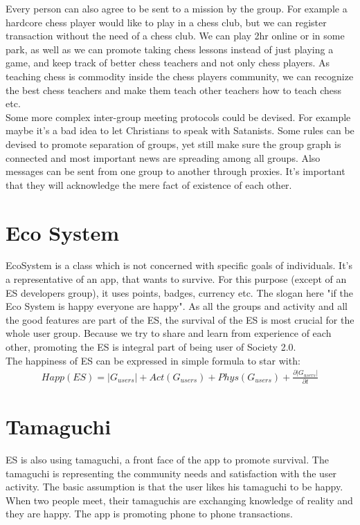 \documentclass{article}
\begin{document}
Every person can also agree to be sent to a mission by the group. For example a hardcore chess player would like to play in a chess club, but we can register transaction without the need of a chess club. We can play 2hr online or in some park, as well as we can promote taking chess lessons instead of just playing a game, and keep track of better chess teachers and not only chess players. As teaching chess is commodity inside the chess players community, we can recognize the best chess teachers and make them teach other teachers how to teach chess etc. \\

Some more complex inter-group meeting protocols could be devised. For example maybe it's a bad idea to let Christians to speak with Satanists. Some rules can be devised to promote separation of groups, yet still make sure the group graph is connected and most important news are spreading among all groups. Also messages can be sent from one group to another through proxies. It's important that they will acknowledge the mere fact of existence of each other. \\

\section{Eco System}

EcoSystem is a class which is not concerned with specific goals of individuals. It's a representative of an app, that wants to survive. For this purpose (except of an ES developers group), it uses points, badges, currency etc. The slogan here "if the Eco System is happy everyone are happy". As all the groups and activity and all the good features are part of the ES, the survival of the ES is most crucial for the whole user group. Because we try to share and learn from experience of each other, promoting the ES is integral part of being user of Society 2.0. \\

The happiness of ES can be expressed in simple formula to star with: 
\begin{align*}
Happ(ES) = |G_{users}| + Act(G_{users}) + Phys(G_{users}) + \frac{\partial |G_{users}|}{\partial t} 
\end{align*}

\section{Tamaguchi}

ES is also using tamaguchi, a front face of the app to promote survival. The tamaguchi is representing the community needs and satisfaction with the user activity. The basic assumption is that the user likes his tamaguchi to be happy. When two people meet, their tamaguchis are exchanging knowledge of reality and they are happy. The app is promoting phone to phone transactions.\\ 
\end{document}
